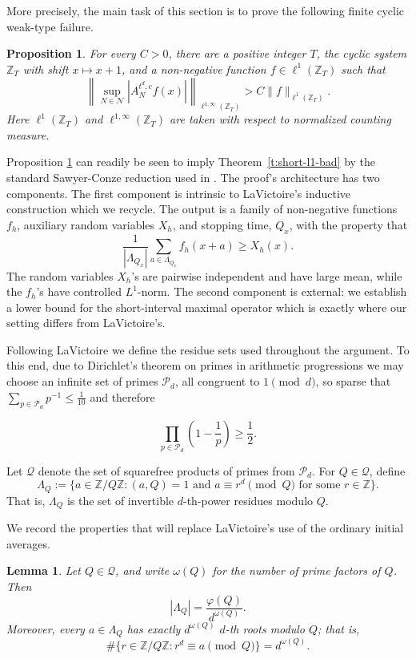 \documentclass[12pt,leqno]{amsart}
\newcounter{counter}
\newcounter{counter2}
\numberwithin{equation}{section}
\numberwithin{counter2}{section}
\newtheorem{proposition}[subsection]{Proposition}
\newcounter{theorem}
\newtheorem{lemma}[subsection]{Lemma}
\theoremstyle{definition}
\theoremstyle{plain}
\begin{document}
More precisely, the main task of this section is to prove the following finite
cyclic weak-type failure.
\begin{proposition}\label{p:finite-weak-failure}
	For every \(C>0\), there are a positive integer \(T\), the cyclic system
	\(\mathbb Z_T\) with shift \(x\mapsto x+1\), and a non-negative function
	\(f\in \ell^1(\mathbb Z_T)\) such that
	\[
	\left\|
	\sup_{N\in\mathcal N}
	\left|
A_{N}^{t^d,c}f(x)
	\right|
	\right\|_{\ell^{1,\infty}(\mathbb Z_T)}
	>
	C\|f\|_{\ell^1(\mathbb Z_T)}.
	\]
	Here \(\ell^1(\mathbb Z_T)\) and \(\ell^{1,\infty}(\mathbb Z_T)\) are taken with
	respect to normalized counting measure.
\end{proposition}
Proposition \ref{p:finite-weak-failure} can readily be seen to imply 
Theorem~\ref{t:short-l1-bad}  by the standard Sawyer-Conze reduction used
in \cite{BM,L9}. The proof's architecture has two components. The first component is intrinsic to 
LaVictoire's inductive construction \cite[Section~4]{L9} which we recycle. The output is a family of non-negative functions \(f_h\),
auxiliary random variables \(X_h\), and stopping time, $Q_x$,
with the property that
\[
\frac1{|\Lambda_{Q_x}|}
\sum_{a\in\Lambda_{Q_x}} f_h(x+a)
\geq X_h(x).
\]
The random variables $X_h$'s are pairwise independent and have large mean, while the
$f_h$'s have controlled \(L^1\)-norm. The second
component is external: we establish a lower bound for the
short-interval maximal operator which is exactly where our setting differs from LaVictoire's.

\bigskip

Following LaVictoire we define the residue sets used throughout the argument. To this end, due to Dirichlet's theorem on primes in arithmetic progressions we may choose an infinite
set of primes \(\mathcal P_d\), all congruent to \(1\pmod d\), so sparse that $\sum_{p\in\mathcal P_d}p^{-1} \leq \frac{1}{10}$ and therefore

\begin{equation} \label{eq:sparseprimes}
	\prod_{p\in\mathcal P_d}\left(1-\frac1p\right)\geq \frac12.
\end{equation}

Let \(\mathcal Q\) denote the set of squarefree products of primes from
\(\mathcal P_d\). For \(Q\in\mathcal Q\), define
\[
\Lambda_Q
:=
\{a\in \mathbb Z/Q\mathbb Z:
(a,Q)=1
\text{ and } a\equiv r^d\pmod Q
\text{ for some } r\in\mathbb Z\}.
\]
That is,  $\Lambda_Q$ is the set of invertible $d$-th-power residues modulo $Q$.

We record the properties that will replace LaVictoire's use of the
ordinary initial averages.
\begin{lemma}\label{l:root-count}
Let \(Q\in\mathcal Q\), and write \(\omega(Q)\) for the number of prime factors
of \(Q\). Then
\[
|\Lambda_Q|=\frac{\varphi(Q)}{d^{\omega(Q)}}.
\]
Moreover, every \(a\in\Lambda_Q\) has exactly \(d^{\omega(Q)}\) \(d\)-th roots
modulo \(Q\); that is,
\[
\#\{r\in\mathbb Z/Q\mathbb Z:r^d\equiv a\pmod Q\}
=
d^{\omega(Q)}.
\]
\end{lemma}
\end{document}

